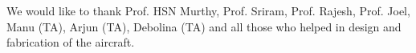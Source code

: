 \acknowledgements %

\indent
We would like to thank Prof. HSN Murthy, Prof. Sriram, Prof. Rajesh, Prof. Joel, Manu (TA), Arjun (TA), Debolina (TA) and all those who helped in design and fabrication of the aircraft.
